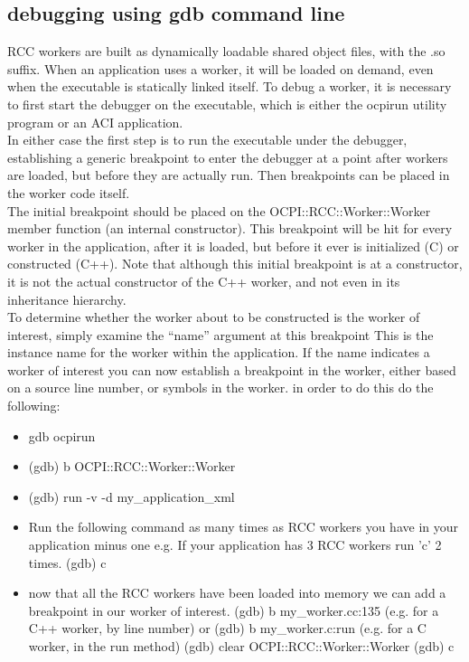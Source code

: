 \subsection{debugging using gdb command line}
\begin{flushleft}
RCC workers are built as dynamically loadable shared object files, with the .so suffix.  When an application uses a worker, it will be loaded on demand, even when the executable is statically linked itself.  To debug a worker, it is necessary to first start the debugger on the executable, which is either the ocpirun utility program or an ACI application.  \\
\vspace{5mm}
In either case the first step is to run the executable under the debugger, establishing a generic breakpoint to enter the debugger at a point after workers are loaded, but before they are actually run.  Then breakpoints can be placed in the worker code itself. \\
\vspace{5mm}
The initial breakpoint should be placed on the OCPI::RCC::Worker::Worker member function (an internal constructor).  This breakpoint will be hit for every worker in the application, after it is loaded, but before it ever is initialized (C) or constructed (C++). Note that although this initial breakpoint is at a constructor, it is not the actual constructor of the C++ worker, and not even in its inheritance hierarchy.\\
\vspace{5mm}
To determine whether the worker about to be constructed is the worker of interest, simply examine the ``name'' argument at this breakpoint  This is the instance name for the worker within the application.  If the name indicates a worker of interest you can now establish a breakpoint in the worker, either based on a source line number, or symbols in the worker.  in order to do this do the following:

\begin{itemize}
   \item gdb ocpirun
   \item (gdb) b OCPI::RCC::Worker::Worker
   \item (gdb) run -v -d my\_application\_xml
   \item Run the following command as many times as RCC workers you have in your application minus one e.g. If your application has 3 RCC workers run 'c' 2 times.
      \subitem (gdb) c
   \item now that all the RCC workers have been loaded into memory we can add a breakpoint in our worker of interest.
   \subitem (gdb) b my\_worker.cc:135 (e.g. for a C++ worker, by line number)
   \subitem  or
   \subitem (gdb) b my\_worker.c:run (e.g. for a C worker, in the run method)
   \subitem (gdb) clear OCPI::RCC::Worker::Worker
   \subitem (gdb) c
\end{itemize}


\end{flushleft}
